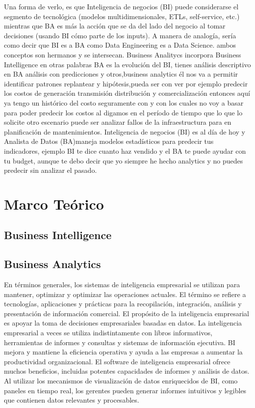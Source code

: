 \documentclass[%
 reprint,
 amsmath,amssymb,
 aps,
]{revtex4-1}
\begin{document}
Una forma de verlo, es que Inteligencia de negocios (BI) puede considerarse el segmento de tecnológica (modelos multidimensionales, ETLs, self-service, etc.) mientras que BA es más la acción que se da del lado del negocio al tomar decisiones (usando BI cómo parte de los inputs). A manera de analogía, sería como decir que BI es a BA como Data Engineering es a Data Science. ambos conceptos son hermanos y se intersecan. Business Analitycs incorpora Business Intelligence en otras palabras BA es la evolución del BI, tienes análisis descriptivo en BA análisis con predicciones y otros,business analytics él nos va a permitir identificar patrones replantear y hipótesis,pueda ser con ver por ejemplo predecir los costos de generación transmisión distribución y comercialización entonces aquí ya tengo un histórico del costo seguramente con y con los cuales no voy a basar para poder predecir los costos al digamos en el período de tiempo que lo que lo solicite otro escenario puede ser analizar fallos de la infraestructura para en planificación de mantenimientos.
Inteligencia de negocios (BI) es al día de hoy y Analista de Datos (BA)maneja modelos estadísticos para predecir tus indicadores, ejemplo BI te dice cuanto haz vendido y el BA te puede ayudar con tu budget, aunque te debo decir que yo siempre he hecho analytics y no puedes predecir sin analizar el pasado.



\section {Marco Teórico}

\subsection{Business Intelligence}

\subsection{Business Analytics}
En términos generales, los sistemas de inteligencia empresarial se utilizan para mantener, optimizar y optimizar las operaciones actuales. El término se refiere a tecnologías, aplicaciones y prácticas para la recopilación, integración, análisis y presentación de información comercial. El propósito de la inteligencia empresarial es apoyar la toma de decisiones empresariales basadas en datos. La inteligencia empresarial a veces se utiliza indistintamente con libros informativos, herramientas de informes y consultas y sistemas de información ejecutiva.
BI mejora y mantiene la eficiencia operativa y ayuda a las empresas a aumentar la productividad organizacional. El software de inteligencia empresarial ofrece muchos beneficios, incluidas potentes capacidades de informes y análisis de datos. Al utilizar los mecanismos de visualización de datos enriquecidos de BI, como paneles en tiempo real, los gerentes pueden generar informes intuitivos y legibles que contienen datos relevantes y procesables.
\end{document}
